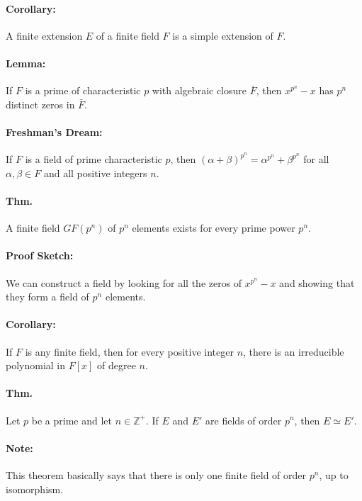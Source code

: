 \documentclass[10pt,a4paper]{article}
\begin{document}
\paragraph{Corollary:} A finite extension $E$ of a finite field $F$ is a simple extension of $F$.

\paragraph{Lemma:} If $F$ is a prime of characteristic $p$ with algebraic closure $\bar{F}$, then $x^{p^n}-x$ has $p^n$ distinct zeros in $\bar{F}$.

\paragraph{Freshman's Dream:} If $F$ is a field of prime characteristic $p$, then $(\alpha+\beta)^{p^n} = \alpha^{p^n}+\beta^{p^n}$ for all $\alpha,\beta \in F$ and all positive integers $n$.

\paragraph{Thm.} A finite field $GF(p^n)$ of $p^n$ elements exists for every prime power $p^n$.

\paragraph{Proof Sketch:} We can construct a field by looking for all the zeros of $x^{p^n}-x$ and showing that they form a field of $p^n$ elements.

\paragraph{Corollary:} If $F$ is any finite field, then for every positive integer $n$, there is an irreducible polynomial in $F[x]$ of degree $n$.

\paragraph{Thm.} Let $p$ be a prime and let $n \in \mathbb{Z}^+$. If $E$ and $E'$ are fields of order $p^n$, then $E \simeq E'$.

\paragraph{Note:} This theorem basically says that there is only one finite field of order $p^n$, up to isomorphism.
\end{document}

